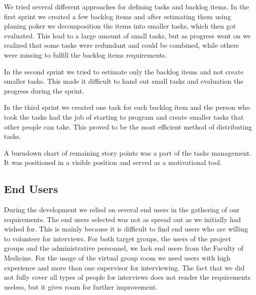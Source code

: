 We tried several different approaches for defining tasks and backlog items. 
In the first sprint we created a few backlog items and after estimating them using planing poker we decomposition the items into smaller tasks, which then got evaluated. 
This lead to a large amount of small tasks, but as progress went on we realized that some tasks were redundant and could be combined, while others were missing to fulfill the backlog items requirements. 

In the second sprint we tried to estimate only the backlog items and not create smaller tasks. 
This made it difficult to hand out small tasks and evaluation the progress during the sprint. 

In the third sprint we created one task for each backlog item and the person who took the tasks had the job of starting to program and create smaller tasks that other people can take. 
This proved to be the most efficient method of distributing tasks.

A burndown chart of remaining story points was a part of the tasks management.
It was positioned in a visible position and served as a motivational tool.


\subsection{End Users}
During the development we relied on several end users in the gathering of our requirements.
The end users selected was not as spread out as we initially had wished for. 
This is mainly because it is difficult to find end users who are willing to volunteer for interviews. 
For both target groups, the users of the project groups and the administrative personnel, we lack end users from the Faculty of Medicine.
For the usage of the virtual group room we need users with high experience and more than one supervisor for interviewing. 
The fact that we did not fully cover all types of people for interviews does not render the requirements useless, but it gives room for further improvement.